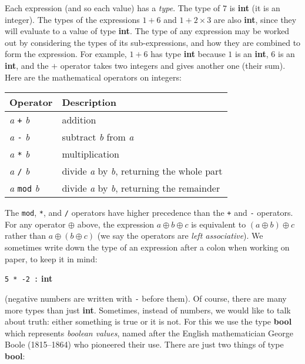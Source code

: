 \documentclass[]{book}
\newcommand{\smspace}{\vspace{4mm}}
\begin{document}
Each expression (and so each value) has a \textit{type}. The type of $7$ is
\textsf{\textbf{int}} (it is an integer). The types of the expressions $1 + 6$ and $1 + 2 \times 3$ are also
\textsf{\textbf{int}}, since they will evaluate to a value of type \textsf{\textbf{int}}. The type of any expression may be worked out by considering the types of its
 sub-expressions, and how they are combined to form the expression. For example, $1 + 6$ has
type \textsf{\textbf{int}} because $1$ is an \textsf{\textbf{int}}, $6$ is an \textsf{\textbf{int}}, and
the $+$ operator takes two integers and gives another one (their sum). Here are the mathematical operators on integers:

\smspace
\noindent\begin{tabular}{@{}ll@{}} \toprule
Operator & Description\\
\midrule
\index{+@\texttt{+}}\textit{a} \texttt{+} \textit{b} & addition\\
\index{-@\texttt{-}}\textit{a} \texttt{-} \textit{b} & subtract \textit{b} from \textit{a}\\
\index{*@\texttt{*}}\textit{a} \texttt{*} \textit{b} & multiplication\\
\index{/@\texttt{/}}\textit{a} \texttt{/} \textit{b} & divide \textit{a} by \textit{b}, returning the whole part\\
\index{mod@\texttt{mod}}\textit{a} \texttt{mod} \textit{b} & divide \textit{a} by \textit{b}, returning the remainder\\ \bottomrule
\end{tabular}
\smspace

\noindent The \texttt{mod}, \texttt{*}, and \texttt{/} operators have higher precedence than the \texttt{+} and \texttt{-} operators. For any operator $\oplus$ above, the expression $a \oplus b\oplus c$ is equivalent to $(a \oplus b)\oplus c$ rather than $a \oplus (b \oplus c)$  (we say the operators are \textit{left associative}). We sometimes write down the type of an expression after a colon when working on paper, to keep it in mind:

\smspace
\texttt{5 * -2 :}\textbf{\textsf{ int}}
\smspace

\noindent (negative numbers are written with \texttt{-} before them). Of course, there are many more types than just \textsf{\textbf{int}}. Sometimes, instead of numbers, we would like to talk about truth: either something is true or it is not. For this we use the type \textsf{\textbf{bool}} which represents \textit{boolean values}, named after the English mathematician George Boole (1815--1864) who pioneered their use. There are just two things of type \textbf{\textsf{bool}}:
\end{document}
